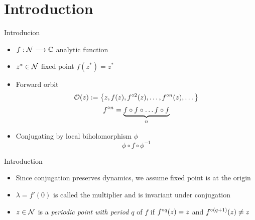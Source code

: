 \section{Introduction}
\begin{frame}{Introducion}
    \begin{itemize}
        \item $f : \mathcal{N} \longrightarrow \mathbb{C}$ analytic function
        \item $z^* \in \mathcal{N}$ fixed point $f(z^*) = z^*$
        \item Forward orbit
        \[
        \mathcal{O}(z) := \left\{z, f(z), f^{\circ2}(z), \dots, f^{\circ n}(z), \dots \right\}
        \]
        \[
        f^{\circ n} = \underbrace{f \circ f \circ \dots f \circ f}_\text{$n$}
        \]
        \item Conjugating by local biholomorphism $\phi$
        \[
        \phi \circ f \circ \phi^{-1}
        \]
    \end{itemize}
\end{frame}

\begin{frame}{Introduction}
    \begin{itemize}
        \item Since conjugation preserves dynamics, we assume fixed point is at the origin
        \item $\lambda = f'(0)$ is called the multiplier and is invariant under conjugation
        \item $z \in \mathcal{N}$ is a \emph{periodic point with period $q$} of $f$ if $f^{\circ q}(z) = z$ and $f^{\circ(q+1)}(z) \neq z$
    \end{itemize}
\end{frame}